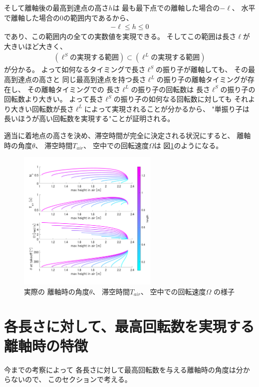 \documentclass[a4paper,11pt]{jsarticle}
\begin{document}
そして離軸後の最高到達点の高さ$h$は
最も最下点での離軸した場合の$-\ell$、
水平で離軸した場合の$0$の範囲内であるから、
\begin{align*}
  -\ell \leq h \leq 0
\end{align*}
であり、この範囲内の全ての実数値を実現できる。
そしてこの範囲は長さ$\ell$が大きいほど大きく、
\begin{align*}
  (\ell^S\textrm{の実現する範囲}) \subset (\ell^L\textrm{の実現する範囲})
\end{align*}
が分かる。
よって如何なるタイミングで長さ$\ell^S$の振り子が離軸しても、
その最高到達点の高さと
同じ最高到達点を持つ長さ$\ell^L$の振り子の離軸タイミングが存在し、
その離軸タイミングでの
長さ$\ell^L$の振り子の回転数は
長さ$\ell^S$の振り子の回転数より大きい。
よって長さ$\ell^S$の振り子の如何なる回転数に対しても
それより大きい回転数が長さ$\ell^L$によって実現されることが分かるから、
"単振り子は長いほうが高い回転数を実現する"ことが証明される。


適当に着地点の高さを決め、滞空時間が完全に決定される状況にすると、
離軸時の角度$\theta$、
滞空時間$T_{air}$、
空中での回転速度$\Omega$は
図\ref{result.png}のようになる。
\begin{figure}[h]
  \centering
  \includegraphics[width = 0.6\textwidth]{result.png}
  \caption{
    実際の
    離軸時の角度$\theta$、
    滞空時間$T_{air}$、
    空中での回転速度$\Omega$
    の様子
    }
  \label{result.png}
\end{figure}

\section{各長さに対して、最高回転数を実現する離軸時の特徴}

今までの考察によって
各長さに対して最高回転数を与える離軸時の角度は分からないので、
このセクションで考える。
\end{document}
